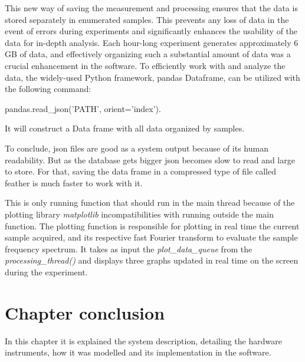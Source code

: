     This new way of saving the measurement and processing ensures that the data is stored separately in enumerated samples.
    This prevents any loss of data in the event of errors during experiments and significantly enhances the usability of the data for in-depth analysis. Each hour-long experiment generates approximately 6 GB of data, and effectively organizing such a substantial amount of data was a crucial enhancement in the software. To efficiently work with and analyze the data, the widely-used Python framework, pandas Dataframe, can be utilized with the following command:
    
    pandas.read\_json('PATH', orient='index').

    It will construct a Data frame with all data organized by samples.

    To conclude, json files are good as a system output because of its human readability. But as the database gets bigger json becomes slow to read and large to store. For that, saving the data frame in a compressed type of file called feather is much faster to work with it.

    This is only running function that should run in the main thread because of the plotting library \emph{matplotlib} incompatibilities with running outside the main function. 
    The plotting function is responsible for plotting in real time the current sample acquired, and its respective fast Fourier transform to evaluate the sample frequency spectrum.
    It takes as input the \emph{plot\_data\_queue} from the \emph{processing\_thread()} and displays three graphs updated in real time on the screen during the experiment.

  \section{Chapter conclusion}

    In this chapter it is explained the system description, detailing the hardware instruments, how it was modelled and its implementation in the software. 


\clearpage